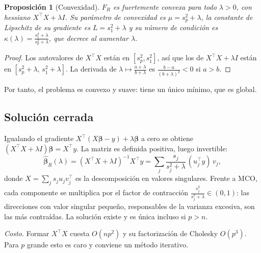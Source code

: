 \documentclass[11pt,a4paper]{article}
\newcommand{\bt}{\bm{\beta}}
\newcommand{\bh}{\hat{\bm{\beta}}}
\theoremstyle{simple}
\newtheorem{proposicion}{Proposición}[section]
\begin{document}
\begin{proposicion}[Convexidad]\label{prop:convR}
$F_R$ es fuertemente convexa para todo $\lambda>0$, con hessiano $X^\top X+\lambda I$. Su parámetro de convexidad es $\mu=s_p^2+\lambda$, la constante de Lipschitz de su gradiente es $L=s_1^2+\lambda$ y su número de condición es $\kappa(\lambda)=\frac{s_1^2+\lambda}{s_p^2+\lambda}$, que decrece al aumentar $\lambda$.
\end{proposicion}
\begin{proof}
Los autovalores de $X^\top X$ están en $[s_p^2,s_1^2]$, así que los de $X^\top X+\lambda I$ están en $[s_p^2+\lambda,\,s_1^2+\lambda]$. La derivada de $\lambda\mapsto\frac{a+\lambda}{b+\lambda}$ es $\frac{b-a}{(b+\lambda)^2}<0$ si $a>b$.
\end{proof}
Por tanto, el problema es convexo y suave: tiene un único mínimo, que es global.

\subsection{Solución cerrada}
Igualando el gradiente $X^\top(X\bt-y)+\lambda\bt$ a cero se obtiene $(X^\top X+\lambda I)\bt=X^\top y$. La matriz es definida positiva, luego invertible:
\begin{equation}
\bh_R(\lambda)=(X^\top X+\lambda I)^{-1}X^\top y=\sum_{j}\frac{s_j}{s_j^2+\lambda}\,(u_j^\top y)\,v_j ,
\end{equation}
donde $X=\sum_j s_j u_j v_j^\top$ es la descomposición en valores singulares. Frente a MCO, cada componente se multiplica por el factor de contracción $\frac{s_j^2}{s_j^2+\lambda}\in(0,1)$: las direcciones con valor singular pequeño, responsables de la varianza excesiva, son las más contraídas. La solución existe y es única incluso si $p>n$.

\emph{Costo.} Formar $X^\top X$ cuesta $O(np^2)$ y su factorización de Cholesky $O(p^3)$. Para $p$ grande esto es caro y conviene un método iterativo.
\end{document}
